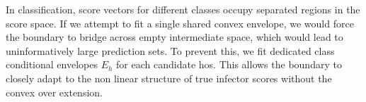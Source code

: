 


In classification, score vectors for different classes occupy separated regions in the score space. If we attempt to fit a 
single shared convex envelope, we would force the boundary to bridge across empty intermediate space, which would lead to 
uninformatively large prediction sets. To prevent this, we fit dedicated class conditional envelopes $E_h$ for each 
candidate hos. This allows the boundary to closely adapt to the non linear structure of true infector scores without the 
convex over extension.


